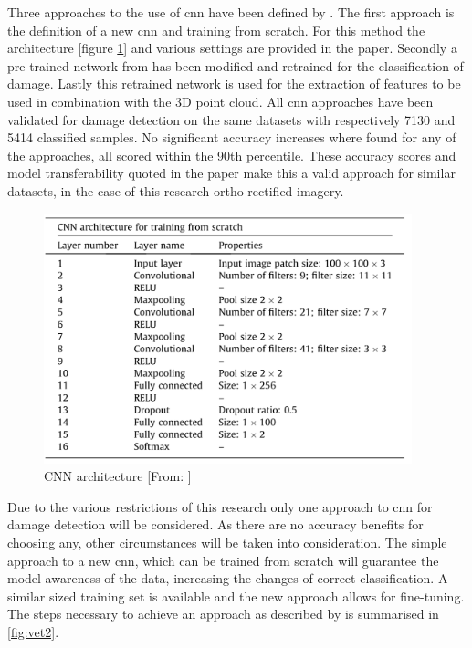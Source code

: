 \noindent Three approaches to the use of \ac{cnn} have been defined by \cite{Vetrivel2016b}. The first approach is the definition of a new \ac{cnn} and training from scratch. For this method the architecture [figure \ref{fig:vet1}] and various settings are provided in the paper. Secondly a pre-trained network from \citet{Krizhevsky2012} has been modified and retrained for the classification of damage. Lastly this retrained network is used for the extraction of features to be used in combination with the 3D point cloud. All \ac{cnn} approaches have been validated for damage detection on the same datasets with respectively 7130 and 5414 classified samples. No significant accuracy increases where found for any of the approaches, all scored within the 90th percentile. These accuracy scores and model transferability quoted in the paper make this a valid approach for similar datasets, in the case of this research ortho-rectified imagery.

\begin{figure}[!h]
	\centering
	\captionsetup{justification=raggedright,singlelinecheck=false}
	\includegraphics[width=0.95\textwidth]{figs/vet1.png}
	\caption{\footnotesize{CNN architecture [From: \citet{Vetrivel2016b}]}}
	\label{fig:vet1}
\end{figure}

\noindent Due to the various restrictions of this research only one approach to \ac{cnn} for damage detection will be considered. As there are no accuracy benefits for choosing any, other circumstances will be taken into consideration. The simple approach to a new \ac{cnn}, which can be trained from scratch will guarantee the model awareness of the data, increasing the changes of correct classification. A similar sized training set is available and the new approach allows for fine-tuning. The steps necessary to achieve an approach as described by \citet{Vetrivel2016b} is summarised in \ref{fig:vet2}.

